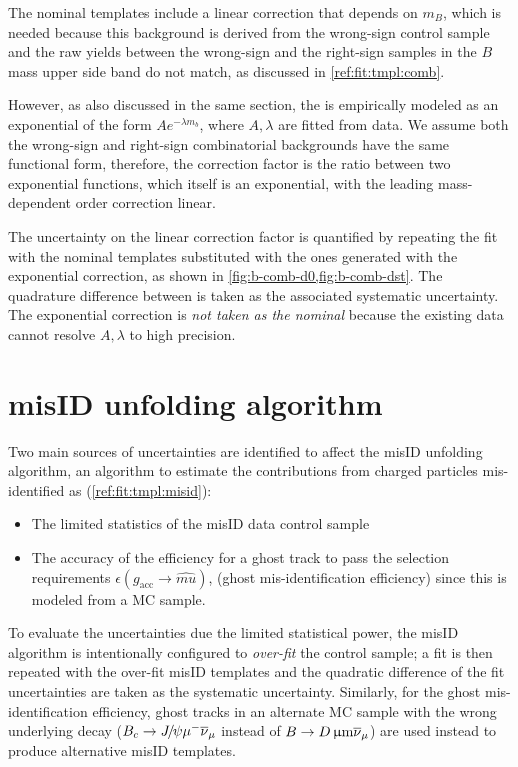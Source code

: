 The nominal \BComb templates include a linear correction that depends on $m_B$,
which is needed because this background is derived from the wrong-sign control
sample and the raw yields between the wrong-sign and the right-sign samples
in the $B$ mass upper side band do not match,
as discussed in \cref{ref:fit:tmpl:comb}.

However, as also discussed in the same section,
the \BComb is empirically modeled as an exponential of the form
$A e^{-\lambda m_b}$,
where $A, \lambda$ are fitted from data.
We assume both the wrong-sign and right-sign combinatorial backgrounds have the
same functional form,
therefore, the correction factor is the ratio between two exponential functions,
which itself is an exponential,
with the leading mass-dependent order correction linear.

The uncertainty on the linear correction factor is quantified by
repeating the fit with the nominal \BComb templates substituted with
the ones generated with the exponential correction,
as shown in
\cref{fig:b-comb-d0,fig:b-comb-dst}.
The quadrature difference between \RDX is taken as the associated systematic
uncertainty.
The exponential correction is \emph{not taken as the nominal} because the
existing data cannot resolve $A, \lambda$ to high precision.


\section{\muon misID unfolding algorithm}
\label{sys-algo-misid}

Two main sources of uncertainties are identified to affect the \muon misID
unfolding algorithm, an algorithm to estimate the contributions from charged
particles mis-identified as \muon (\cref{ref:fit:tmpl:misid}):
\begin{itemize}
    \item The limited statistics of the misID data control sample
    \item The accuracy of the efficiency for a ghost track to pass the \muon
        selection requirements $\epsilon(g_\text{acc} \rightarrow \hat{mu})$,
        (ghost mis-identification efficiency)
        since this is modeled from a MC sample.
\end{itemize}

To evaluate the uncertainties due the limited statistical power,
the misID algorithm is intentionally configured to \emph{over-fit} the control
sample;
a fit is then repeated with the over-fit misID templates and the quadratic
difference of the fit uncertainties are taken as the systematic uncertainty.
Similarly, for the ghost mis-identification efficiency,
ghost tracks in an alternate MC sample with the wrong underlying decay
($B_c \rightarrow {\ensuremath{{J\mskip -3mu/\mskip -2mu\psi}}}{\ensuremath{\mu^-}}{\ensuremath{{\overline{\nu}}_\mu}}$ instead of $B \rightarrow D \,\upmu\text{m}{\ensuremath{{\overline{\nu}}_\mu}}$) are
used instead to produce alternative misID templates.


